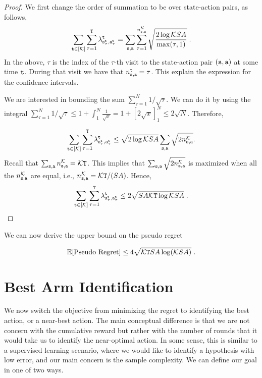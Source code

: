\begin{proof}
    We first change the order of summation to be over state-action pairs, as follows,
    \[
    \sum_{{\tt t}\in [\mathcal K]} \sum_{\tau=1}^{\tt T}
\lambda^{\tt t}_{{\tt s}_\tau^{\tt t},{\tt a}_\tau^{\tt t}} =
\sum_{{\tt s},{\tt a}} \sum_{\tau=1}^{n_{{\tt s},{\tt a}}^\mathcal K}
\sqrt{\frac{2\log \mathcal K SA}{\max(\tau,1)}}\;.
    \]
In the above, $\tau$ is the index of the $\tau$-th visit to the state-action pair $({\tt s},{\tt a})$ at some time ${\tt t}$. During that visit we have that  $n_{{\tt s},{\tt a}}^{\tt t}=\tau$.
This explain the expression for the confidence intervals.

We are interested in bounding the sum $\sum_{\tau=1}^N 1/\sqrt{\tau}$. We can do it by using the integral $\sum_{\tau=1}^N 1/\sqrt{\tau}\leq 1+ \int_1^N \frac{1}{\sqrt{x}}= 1+[2\sqrt{x}]_1^N\leq 2\sqrt{N}$.
Therefore,

    \[
    \sum_{{\tt t}\in [\mathcal K]} \sum_{\tau=1}^{\tt T}
\lambda^{\tt t}_{{\tt s}_\tau^{\tt t},{\tt a}_\tau^{\tt t}} \leq
\sqrt{2\log \mathcal K SA}
\sum_{{\tt s},{\tt a}}
\sqrt{2 n_{{\tt s},{\tt a}}^\mathcal K }.
    \]
Recall that $\sum_{{\tt s},{\tt a}} n_{{\tt s},{\tt a}}^\mathcal K  =\mathcal K {\tt T}$. This implies that $\sum_{{\tt s},{\tt a}}
\sqrt{2 n_{{\tt s},{\tt a}}^\mathcal K }$ is maximized when all the $n_{{\tt s},{\tt a}}^\mathcal K $ are equal, i.e., $n_{{\tt s},{\tt a}}^\mathcal K =\mathcal K {\tt T}/(SA)$. Hence,
    \[
    \sum_{{\tt t}\in [\mathcal K]} \sum_{\tau=1}^{\tt T}
\lambda^{\tt t}_{{\tt s}_\tau^{\tt t},{\tt a}_\tau^{\tt t}} \leq
2
\sqrt{SA\mathcal K {\tt T}\log \mathcal K SA}\;.
    \]
\end{proof}

We can now derive the upper bound on the pseudo regret
\begin{theorem}
    \[
    \mathbb{E}[\text{Pseudo Regret}] \leq 4\sqrt{\mathcal K {\tt T} SA\log (\mathcal K SA)}\;.
    \]
\end{theorem}

\section{Best Arm Identification}

We now switch the objective from minimizing the regret to identifying the best action, or a near-best action. The main conceptual difference is that we are not concern with the cumulative reward but rather with the number of rounds that it would take us to identify the near-optimal action. 
In some sense, this is similar to a supervised learning scenario, where we would like to identify a hypothesis with low error, and our main concern is the sample complexity.
We can define our goal in one of two ways.


